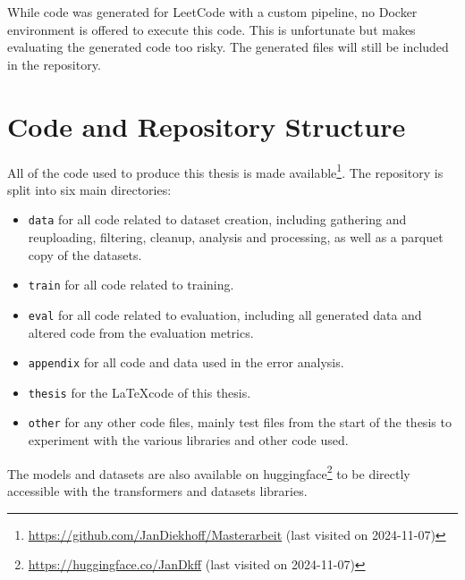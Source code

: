 While code was generated for LeetCode with a custom pipeline, no Docker environment is offered to execute this code.
This is unfortunate but makes evaluating the generated code too risky.
The generated files will still be included in the repository.

\section{Code and Repository Structure}
\label{sec:repo}

All of the code used to produce this thesis is made available\footnote{\url{https://github.com/JanDiekhoff/Masterarbeit} (last visited on 2024-11-07)}.
The repository is split into six main directories:
\begin{itemize}
    \item \texttt{data} for all code related to dataset creation, including gathering and reuploading, filtering, cleanup, analysis and processing, as well as a parquet copy of the datasets.
    \item \texttt{train} for all code related to training.
    \item \texttt{eval} for all code related to evaluation, including all generated data and altered code from the evaluation metrics.
    \item \texttt{appendix} for all code and data used in the error analysis.
    \item \texttt{thesis} for the \LaTeX code of this thesis.
    \item \texttt{other} for any other code files, mainly test files from the start of the thesis to experiment with the various libraries and other code used.
\end{itemize}

The models and datasets are also available on huggingface\footnote{\url{https://huggingface.co/JanDkff} (last visited on 2024-11-07)} to be directly accessible with the transformers and datasets libraries.